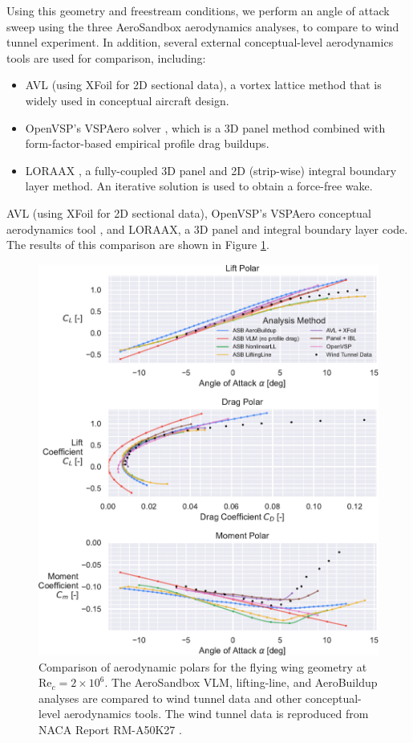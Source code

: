 Using this geometry and freestream conditions, we perform an angle of attack sweep using the three AeroSandbox aerodynamics analyses, to compare to wind tunnel experiment. In addition, several external conceptual-level aerodynamics tools are used for comparison, including:
\begin{itemize}[noitemsep]
    \item AVL \cite{avl} (using XFoil \cite{drela_xfoil_1989} for 2D sectional data), a vortex lattice method that is widely used in conceptual aircraft design.
    \item OpenVSP's VSPAero solver \cite{mcdonald_open_2022}, which is a 3D panel method combined with form-factor-based empirical profile drag buildups.
    \item LORAAX \cite{loraax}, a fully-coupled 3D panel and 2D (strip-wise) integral boundary layer method. An iterative solution is used to obtain a force-free wake.
\end{itemize}

AVL \cite{avl} (using XFoil \cite{drela_xfoil_1989} for 2D sectional data), OpenVSP's VSPAero conceptual aerodynamics tool \cite{mcdonald_open_2022}, and LORAAX, a 3D panel and integral boundary layer code. The results of this comparison are shown in Figure \ref{fig:fw_results}.

\begin{figure}[H]
    \centering
    \includegraphics[width=\textwidth]{../figures/aero_validation/flying_wing_polars-crop.pdf}
    \caption{Comparison of aerodynamic polars for the flying wing geometry at $\text{Re}_c=2 \times 10^6$. The AeroSandbox VLM, lifting-line, and AeroBuildup analyses are compared to wind tunnel data and other conceptual-level aerodynamics tools. The wind tunnel data is reproduced from NACA Report RM-A50K27 \cite{tinling_effects_1951}.}
    \label{fig:fw_results}
\end{figure}

